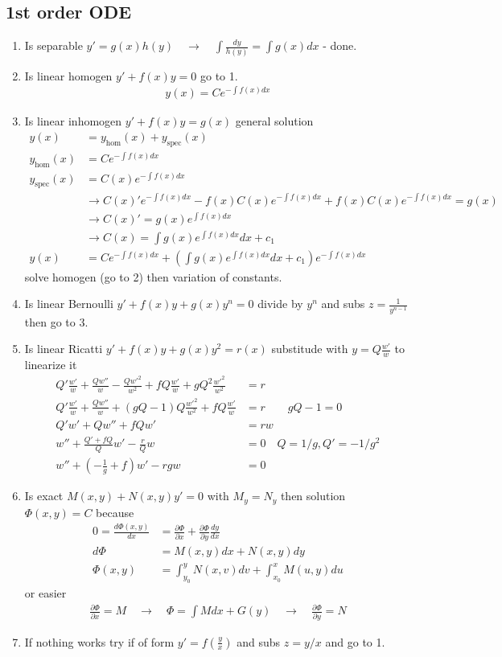 \documentclass[10pt,a4paper]{book}
\theoremstyle{definition}
\begin{document}
\newpage
\subsection{1st order ODE}
\begin{enumerate}
\item Is separable $y'=g(x)h(y)\quad\rightarrow\quad \int\frac{dy}{h(y)}=\int g(x)dx$ - done.
\item Is linear homogen $y'+f(x)y=0$ go to 1.
\begin{align}
y(x)=Ce^{-\int f(x)dx}
\end{align}
\item Is linear inhomogen $y'+f(x)y=g(x)$ general solution
\begin{align}
y(x)&=y_\text{hom}(x)+y_\text{spec}(x)\\
y_\text{hom}(x)&=Ce^{-\int f(x)dx}\\
y_\text{spec}(x)&=C(x)e^{-\int f(x)dx}\\
&\rightarrow C(x)'e^{-\int f(x)dx}-f(x)C(x)e^{-\int f(x)dx}+f(x)C(x)e^{-\int f(x)dx}=g(x)\\
&\rightarrow C(x)'=g(x)e^{\int f(x)dx}\\
&\rightarrow C(x)=\int g(x)e^{\int f(x)dx}dx+c_1\\
y(x)&=Ce^{-\int f(x)dx}+\left(\int g(x)e^{\int f(x)dx}dx+c_1\right)e^{-\int f(x)dx}
\end{align}
solve homogen (go to 2) then variation of constants.
\item Is linear Bernoulli $y'+f(x)y+g(x)y^n=0$ divide by $y^n$ and subs $z=\frac{1}{y^{n-1}}$ then go to 3.
\item Is linear Ricatti $y'+f(x)y+g(x)y^2=r(x)$ substitude with $y=Q\frac{w'}{w}$ to linearize it
\begin{align}
Q'\frac{w'}{w}+\frac{Qw''}{w}-\frac{Q{w'}^2}{w^2}+fQ\frac{w'}{w}+gQ^2\frac{{w'}^2}{w^2}&=r\\
Q'\frac{w'}{w}+\frac{Qw''}{w}+\left(gQ-1\right)Q\frac{{w'}^2}{w^2}+fQ\frac{w'}{w}&=r\qquad gQ-1=0\\
Q'w'+Qw''+fQw'&=rw\\
w''+\frac{Q'+fQ}{Q}w'-\frac{r}{Q}w&=0\quad Q=1/g, Q'=-1/g^2\\
w''+\left(-\frac{1}{g}+f\right)w'-rgw&=0
\end{align}
\item Is exact $M(x,y)+N(x,y)y'=0$ with $M_y=N_y$ then solution $\Phi(x,y)=C$ because
\begin{align}
0=\frac{d\Phi(x,y)}{dx}&=\frac{\partial\Phi}{\partial x}+\frac{\partial\Phi}{\partial y}\frac{dy}{dx}\\
d\Phi&=M(x,y)dx+N(x,y)dy\\
\Phi(x,y)&=\int_{y_0}^yN(x,v)dv+\int_{x_0}^xM(u,y)du
\end{align}
or easier
\begin{align}
\frac{\partial\Phi}{\partial x}=M\quad\rightarrow\quad\Phi=\int M dx+G(y)\quad\rightarrow\quad\frac{\partial\Phi}{\partial y}=N
\end{align}
\item If nothing works try if of form $y'=f\left(\frac{y}{x}\right)$ and subs $z=y/x$ and go to 1.


\end{enumerate}
\end{document}
